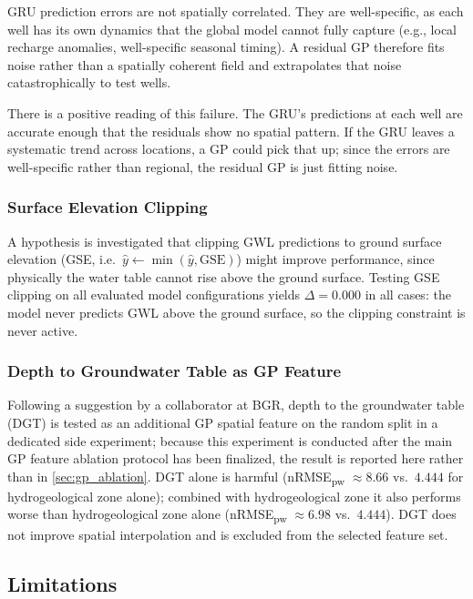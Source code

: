 GRU prediction errors are not spatially correlated. They are well-specific, as each well has its own dynamics that the global model cannot fully capture (e.g., local recharge anomalies, well-specific seasonal timing). A residual GP therefore fits noise rather than a spatially coherent field and extrapolates that noise catastrophically to test wells.

There is a positive reading of this failure. The GRU's predictions at each well are accurate enough that the residuals show no spatial pattern. If the GRU leaves a systematic trend across locations, a GP could pick that up; since the errors are well-specific rather than regional, the residual GP is just fitting noise.


\subsubsection{Surface Elevation Clipping}

A hypothesis is investigated that clipping GWL predictions to ground surface elevation (GSE, i.e.\ $\hat{y} \leftarrow \min(\hat{y}, \text{GSE})$) might improve performance, since physically the water table cannot rise above the ground surface. Testing GSE clipping on all evaluated model configurations yields $\Delta = 0.000$ in all cases: the model never predicts GWL above the ground surface, so the clipping constraint is never active.

\subsubsection{Depth to Groundwater Table as GP Feature}

Following a suggestion by a collaborator at BGR, depth to the groundwater table (DGT) is tested as an additional GP spatial feature on the random split in a dedicated side experiment; because this experiment is conducted after the main GP feature ablation protocol has been finalized, the result is reported here rather than in \cref{sec:gp_ablation}. DGT alone is harmful (nRMSE\textsubscript{pw} $\approx 8.66$ vs.\ $4.444$ for hydrogeological zone alone); combined with hydrogeological zone it also performs worse than hydrogeological zone alone (nRMSE\textsubscript{pw} $\approx 6.98$ vs.\ $4.444$). DGT does not improve spatial interpolation and is excluded from the selected feature set.

\subsection{Limitations}
\label{sec:limitations}

